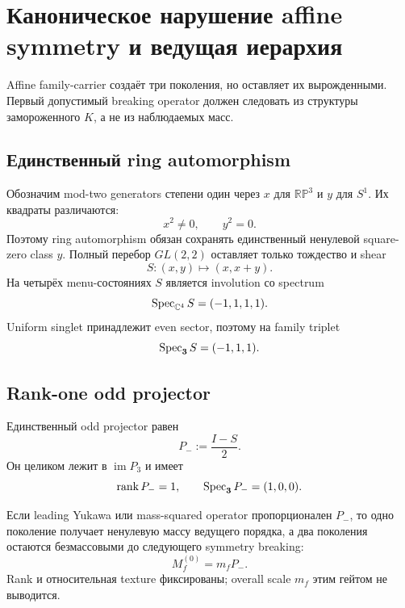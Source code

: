 \chapter{Каноническое нарушение affine symmetry и ведущая иерархия}

Affine family-carrier создаёт три поколения, но оставляет их вырожденными.
Первый допустимый breaking operator должен следовать из структуры
замороженного \(K\), а не из наблюдаемых масс.

\section{Единственный ring automorphism}

Обозначим mod-two generators степени один через \(x\) для
\(\mathbb{RP}^3\) и \(y\) для \(S^1\). Их квадраты различаются:
\begin{equation}
x^2\ne0,
\qquad
y^2=0.
\end{equation}
Поэтому ring automorphism обязан сохранять единственный ненулевой
square-zero class \(y\). Полный перебор \(GL(2,2)\) оставляет только
тождество и shear
\begin{equation}
S:(x,y)\longmapsto(x,x+y).
\end{equation}
На четырёх menu-состояниях \(S\) является involution со spectrum
\begin{equation}
\operatorname{Spec}_{\mathbb C^4}S=(-1,1,1,1).
\end{equation}
Uniform singlet принадлежит even sector, поэтому на family triplet
\begin{equation}
\operatorname{Spec}_{\mathbf3}S=(-1,1,1).
\end{equation}

\section{Rank-one odd projector}

Единственный odd projector равен
\begin{equation}
P_-:=\frac{I-S}{2}.
\end{equation}
Он целиком лежит в \(\operatorname{im}P_3\) и имеет
\begin{equation}
\operatorname{rank} P_-=1,
\qquad
\operatorname{Spec}_{\mathbf3}P_-=(1,0,0).
\end{equation}

\begin{theorem}
Если leading Yukawa или mass-squared operator пропорционален \(P_-\), то
одно поколение получает ненулевую массу ведущего порядка, а два поколения
остаются безмассовыми до следующего symmetry breaking:
\begin{equation}
M_f^{(0)}=m_f P_-.
\end{equation}
Rank и относительная texture фиксированы; overall scale \(m_f\) этим гейтом
не выводится.
\end{theorem}

